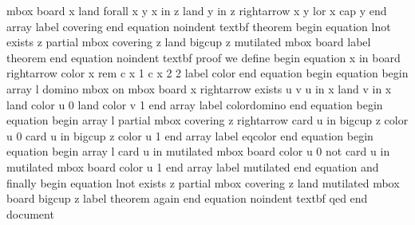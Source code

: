 mbox board x land forall x y x in z land y in z rightarrow x y lor x cap y end array label covering end equation noindent textbf theorem begin equation lnot exists z partial mbox covering z land bigcup z mutilated mbox board label theorem end equation noindent textbf proof we define begin equation x in board rightarrow color x rem c x 1 c x 2 2 label color end equation begin equation begin array l domino mbox on mbox board x rightarrow exists u v u in x land v in x land color u 0 land color v 1 end array label colordomino end equation begin equation begin array l partial mbox covering z rightarrow card u in bigcup z color u 0 card u in bigcup z color u 1 end array label eqcolor end equation begin equation begin array l card u in mutilated mbox board color u 0 not card u in mutilated mbox board color u 1 end array label mutilated end equation and finally begin equation lnot exists z partial mbox covering z land mutilated mbox board bigcup z label theorem again end equation noindent textbf qed end document
